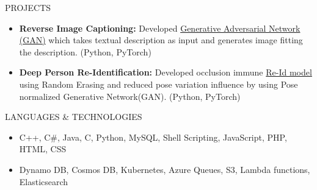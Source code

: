 \documentclass[]{mcdowellcv}
\begin{document}
 \begin{cvsection}{PROJECTS}
		\begin{cvsubsection}{}{}{}
			\begin{itemize}
    			\item \textbf{Reverse Image Captioning:} Developed  \href{https://github.com/aditya30394/Reverse-Image-Captioning}{Generative Adversarial Network (GAN)} which takes textual description as input and generates image fitting the description. (Python, PyTorch)
				\item \textbf{Deep Person Re-Identification:} Developed occlusion immune \href{https://github.com/aditya30394/Person-Re-Identification}{Re-Id model} using Random Erasing and reduced pose variation influence by using Pose normalized Generative Network(GAN). (Python, PyTorch)
			\end{itemize}
		\end{cvsubsection}
	\end{cvsection}
 
        \begin{cvsection}{LANGUAGES \& TECHNOLOGIES}
		\begin{cvsubsection}{}{}{}	
			\begin{itemize}
				\item C++, C\#, Java, C, Python, MySQL, Shell Scripting, JavaScript, PHP, HTML, CSS 
				\item Dynamo DB, Cosmos DB, Kubernetes, Azure Queues, S3, Lambda functions, Elasticsearch
			\end{itemize}
		\end{cvsubsection}
	\end{cvsection}
\end{document}
